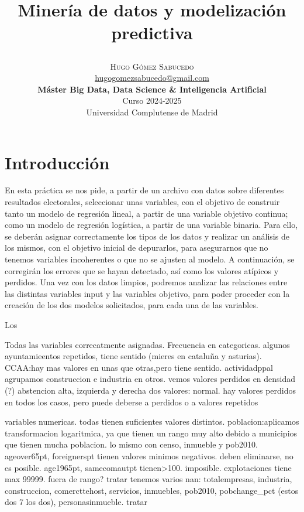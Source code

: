 \documentclass[a4paper,onecolumn]{article}
\title{\begin{center} \Huge Minería de datos y modelización predictiva \end{center}} %
\author{
    \textsc{\Huge Hugo Gómez Sabucedo} \\ %
    \large \href{mailto:hugogomezsabucedo@gmail.com}{hugogomezsabucedo@gmail.com} \\ [2ex] %
    \Large \textbf{Máster Big Data, Data Science \& Inteligencia Artificial} \\
    \normalsize Curso 2024-2025 \\
    \large Universidad Complutense de Madrid
}
\date{} %
\let\stdsection\section
\renewcommand\section{\newpage\stdsection}
\begin{document}
\maketitle
\tableofcontents
\begin{sloppypar}


\section{Introducción} \label{enunciado}
En esta práctica se nos pide, a partir de un archivo con datos sobre diferentes resultados electorales, seleccionar unas variables, con el objetivo
de construir tanto un modelo de regresión lineal, a partir de una variable objetivo continua; como un modelo de regresión logística, a partir de una
variable binaria. Para ello, se deberán asignar correctamente los tipos de los datos y realizar un análisis de los mismos, con el objetivo inicial 
de depurarlos, para asegurarnos que no tenemos variables incoherentes o que no se ajusten al modelo. A continuación, se corregirán los errores que se 
hayan detectado, así como los valores atípicos y perdidos. Una vez con los datos limpios, podremos analizar las relaciones entre las distintas variables 
input y las variables objetivo, para poder proceder con la creación de los dos modelos solicitados, para cada una de las variables.

Los 

Todas las variables correcatmente asignadas.
Frecuencia en categoricas. algunos ayuntamieentos repetidos, tiene sentido (mieres en cataluña y asturias).
CCAA:hay mas valores en unas que otras,pero tiene sentido. actividadppal agrupamos construccion e industria en otros. vemos valores perdidos en densidad (?)
abstencion alta, izquierda y derecha dos valores: normal. hay valores perdidos en todos los casos, pero puede deberse a perdidos o a valores repetidos

variables numericas. todas tienen suficientes valores distintos.
poblacion:aplicamos transformacion logaritmica, ya que tienen un rango muy alto debido a municipios que tienen mucha poblacion. lo mismo con censo, inmueble y pob2010.
ageover65pt, foreignerspt tienen valores minimos negativos. deben eliminarse, no es posible. age1965pt, samecomautpt tienen>100. imposible.
explotaciones tiene max 99999. fuera de rango? tratar
tenemos varios nan: totalempresas, industria, construccion, comercttehost, servicios, inmuebles, pob2010, pobchange_pct (estos dos 7 los dos), personasinmueble. tratar


\end{sloppypar}
\end{document}
